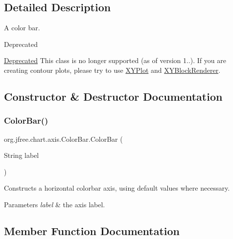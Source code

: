 \subsection{Detailed Description}
A color bar.

\begin{DoxyRefDesc}{Deprecated}
\item[\mbox{\hyperlink{deprecated__deprecated000002}{Deprecated}}]This class is no longer supported (as of version 1..). If you are creating contour plots, please try to use \mbox{\hyperlink{}{X\+Y\+Plot}} and \mbox{\hyperlink{}{X\+Y\+Block\+Renderer}}. \end{DoxyRefDesc}


\subsection{Constructor \& Destructor Documentation}
\mbox{\label{classorg_1_1jfree_1_1chart_1_1axis_1_1_color_bar_a9ece354ede157da87da26103e85be4ee}} 
\subsubsection{\texorpdfstring{Color\+Bar()}{ColorBar()}}
{\footnotesize\ttfamily org.\+jfree.\+chart.\+axis.\+Color\+Bar.\+Color\+Bar (\begin{DoxyParamCaption}\item[{String}]{label }\end{DoxyParamCaption})}

Constructs a horizontal colorbar axis, using default values where necessary.


\begin{DoxyParams}{Parameters}
{\em label} & the axis label. \\
\hline
\end{DoxyParams}


\subsection{Member Function Documentation}
\mbox{\label{classorg_1_1jfree_1_1chart_1_1axis_1_1_color_bar_a8d7661ead21c37e7dcfc55ad89cc22b7}} 
